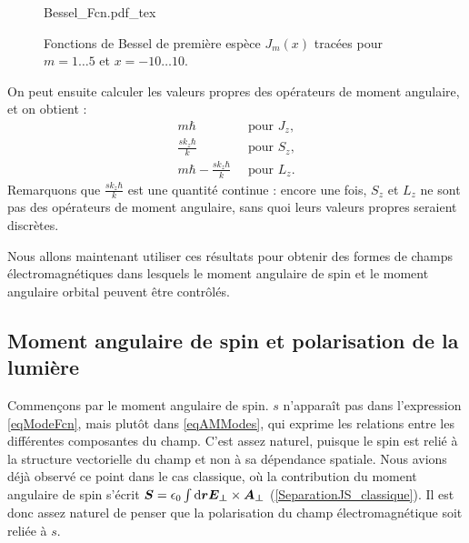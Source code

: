 \begin{figure}[!ht]
\centering
\def\svgwidth{0.8\columnwidth}
{Bessel_Fcn.pdf_tex}
\caption{Fonctions de Bessel de première espèce $J_m(x)$ tracées pour $m=1\ldots5$ et $x=-10\ldots10$.}
\label{Fig:BesselFcn}
\end{figure}

On peut ensuite calculer les valeurs propres des opérateurs de moment angulaire, et on obtient :
\begin{equation}
\begin{alignedat}{1}
m\hbar ~&\mbox{ pour } J_z\mbox{,}\\
\frac{sk_z\hbar}{k} ~&\mbox{ pour } S_z\mbox{,}\\
m\hbar-\frac{sk_z\hbar}{k} ~&\mbox{ pour } L_z\mbox{.}
\end{alignedat}
\label{eq.VP_AM}
\end{equation}
Remarquons que $\frac{sk_z\hbar}{k}$ est une quantité continue : encore une fois, $S_z$ et $L_z$ ne sont pas des opérateurs de moment angulaire, sans quoi leurs valeurs propres seraient discrètes. 


Nous allons maintenant utiliser ces résultats pour obtenir des formes de champs électromagnétiques dans lesquels le moment angulaire de spin et le moment angulaire orbital peuvent être contrôlés.

\subsection{Moment angulaire de spin et polarisation de la lumière}
Commençons par le moment angulaire de spin. $s$ n'apparaît pas dans l'expression \ref{eqModeFcn}, mais plutôt dans \ref{eqAMModes}, qui exprime les relations entre les différentes composantes du champ. C'est assez naturel, puisque le spin est relié à la structure vectorielle du champ et non à sa dépendance spatiale. Nous avions déjà observé ce point dans le cas classique, où la contribution du moment angulaire de spin s'écrit $\bm{S}=\epsilon_0\int{\mathrm{d}\bm{r}\bm{E_{\bot}}\times\bm{A_{\bot}}}$ (\ref{SeparationJS_classique}). Il est donc assez naturel de penser que la polarisation du champ électromagnétique soit reliée à $s$.

